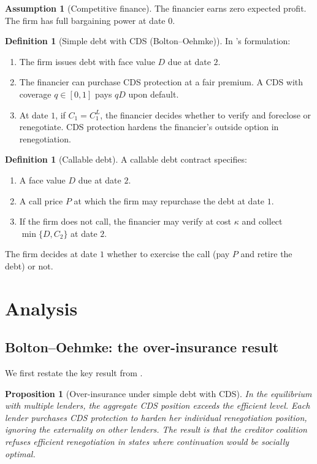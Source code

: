 \documentclass[12pt,a4paper]{article}
\theoremstyle{plain}
\newtheorem{proposition}[theorem]{Proposition}
\theoremstyle{definition}
\newtheorem{definition}[theorem]{Definition}
\newtheorem{assumption}{Assumption}
\theoremstyle{remark}
\begin{document}
\begin{assumption}[Competitive finance]\label{a:comp}
The financier earns zero expected profit. The firm has full bargaining power at date $0$.
\end{assumption}

\begin{definition}[Simple debt with CDS (Bolton--Oehmke)]\label{d:bo}
In \citeauthor{boltonoehmke2011}'s formulation:
\begin{enumerate}[nosep,label=(\roman*)]
\item The firm issues debt with face value $D$ due at date $2$.
\item The financier can purchase CDS protection at a fair premium. A CDS with coverage $q \in [0,1]$ pays $qD$ upon default.
\item At date $1$, if $C_1 = C_1^L$, the financier decides whether to verify and foreclose or renegotiate. CDS protection hardens the financier's outside option in renegotiation.
\end{enumerate}
\end{definition}

\begin{definition}[Callable debt]\label{d:call}
A callable debt contract specifies:
\begin{enumerate}[nosep,label=(\roman*)]
\item A face value $D$ due at date $2$.
\item A call price $P$ at which the firm may repurchase the debt at date $1$.
\item If the firm does not call, the financier may verify at cost $\kappa$ and collect $\min\{D, C_2\}$ at date $2$.
\end{enumerate}
The firm decides at date $1$ whether to exercise the call (pay $P$ and retire the debt) or not.
\end{definition}

\section{Analysis}

\subsection{Bolton--Oehmke: the over-insurance result}

We first restate the key result from \citet{boltonoehmke2011}.

\begin{proposition}[Over-insurance under simple debt with CDS]\label{p:bo}
In the \citet{boltonoehmke2011} equilibrium with multiple lenders, the aggregate CDS position exceeds the efficient level. Each lender purchases CDS protection to harden her individual renegotiation position, ignoring the externality on other lenders. The result is that the creditor coalition refuses efficient renegotiation in states where continuation would be socially optimal.
\end{proposition}
\end{document}
